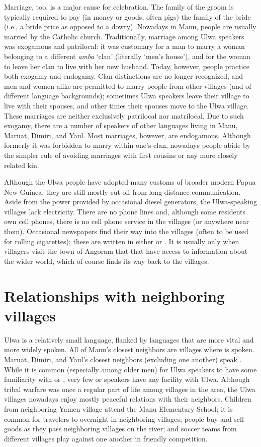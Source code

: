Marriage, too, is a major cause for celebration. The family of the groom is typically required to pay (in money or goods, often pigs) the family of the bride (i.e., a bride price as opposed to a dowry). Nowadays in Manu, people are usually married by the Catholic church. Traditionally, marriage among Ulwa speakers was exogamous and patrilocal: it was customary for a man to marry a woman belonging to a different \textit{amba} ‘clan’ (literally ‘men’s house’), and for the woman to leave her clan to live with her new husband. Today, however, people practice both exogamy and endogamy. Clan distinctions are no longer recognized, and men and women alike are permitted to marry people from other villages (and of different language backgrounds); sometimes Ulwa speakers leave their village to live with their spouses, and other times their spouses move to the Ulwa village. These marriages are neither exclusively patrilocal nor matrilocal. Due to such exogamy, there are a number of speakers of other languages living in Manu, Maruat, Dimiri, and Yaul. Most marriages, however, are endogamous. Although formerly it was forbidden to marry within one’s clan, nowadays people abide by the simpler rule of avoiding marriages with first cousins or any more closely related  kin.

Although the Ulwa people have adopted many customs of broader modern Papua New Guinea, they are still mostly cut off from long-distance communication. Aside from the power provided by occasional diesel generators, the Ulwa-speaking villages lack electricity. There are no phone lines and, although some residents own cell phones, there is no cell phone service in the villages (or anywhere near them). Occasional newspapers find their way into the villages (often to be used for rolling cigarettes); these are written in either  or . It is usually only when villagers visit the town of Angoram that that have access to information about the wider world, which of course finds its way back to the villages.

\section{Relationships with neighboring villages}\label{sec:1.5.5}

Ulwa is a relatively small language, flanked by languages that are more  vital and more widely spoken. All of Manu’s closest neighbors are villages where \mbox{} is spoken. Maruat, Dimiri, and Yaul’s closest neighbors (excluding one another) speak . While it is common (especially among older men) for Ulwa speakers to have some familiarity with  or , very few \mbox{} or  speakers have any facility with Ulwa. Although tribal warfare was once a regular part of life among villages in the area, the Ulwa villages nowadays enjoy mostly peaceful relations with their neighbors. Children from neighboring Yamen village attend the Manu Elementary School; it is common for travelers to overnight in neighboring villages; people buy and sell goods as they pass neighboring villages on the river; and soccer teams from different villages play against one another in friendly competition.

